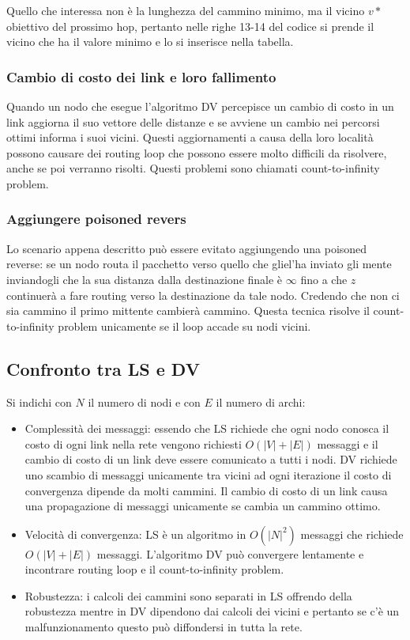 Quello che interessa non \`e la lunghezza del cammino minimo, ma il vicino $v*$ obiettivo del prossimo hop, pertanto nelle righe 13-14 del codice si
prende il vicino che ha il valore minimo e lo si inserisce nella tabella. 
\subsubsection{Cambio di costo dei link e loro fallimento}
Quando un nodo che esegue l'algoritmo DV percepisce un cambio di costo in un link aggiorna il suo vettore delle distanze e se avviene un cambio nei percorsi
ottimi informa i suoi vicini. Questi aggiornamenti a causa della loro localit\`a possono causare dei routing loop che possono essere molto difficili da
risolvere, anche se poi verranno risolti. Questi problemi sono chiamati count-to-infinity problem. 
\subsubsection{Aggiungere poisoned revers}
Lo scenario appena descritto pu\`o essere evitato aggiungendo una poisoned reverse: se un nodo routa il pacchetto verso quello che gliel'ha inviato gli 
mente inviandogli che la sua distanza dalla destinazione finale \`e $\infty$ fino a che $z$ continuer\`a a fare routing verso la destinazione da tale nodo.
Credendo che non ci sia cammino il primo mittente cambier\`a cammino. Questa tecnica risolve il count-to-infinity problem unicamente se il loop accade su 
nodi vicini. 
\subsection{Confronto tra LS e DV}
Si indichi con $N$ il numero di nodi e con $E$ il numero di archi:
\begin{itemize}
\item Complessit\`a dei messaggi: essendo che LS richiede che ogni nodo conosca il costo di ogni link nella rete vengono richiesti $O(|V|+|E|)$ messaggi e 
il cambio di costo di un link deve essere comunicato a tutti i nodi. DV richiede uno scambio di messaggi unicamente tra vicini ad ogni iterazione il costo
di convergenza dipende da molti cammini. Il cambio di costo di un link causa una propagazione di messaggi unicamente se cambia un cammino ottimo.
\item Velocit\`a di convergenza: LS \`e un algoritmo in $O(|N|^2)$ messaggi che richiede $O(|V|+|E|)$ messaggi. L'algoritmo DV pu\`o convergere lentamente
e incontrare routing loop e il count-to-infinity problem.
\item Robustezza: i calcoli dei cammini sono separati in LS offrendo della robustezza mentre in DV dipendono dai calcoli dei vicini e pertanto se c'\`e un
malfunzionamento questo pu\`o diffondersi in tutta la rete.
\end{itemize}
